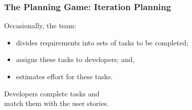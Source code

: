 \begin{frame}

\frametitle{The Planning Game: Iteration Planning}

\begin{changemargin}{1cm}

Occasionally, the team:

\begin{itemize}
\item divides requirements into sets of tasks to be completed;
\item assigns these tasks to developers; and,
\item estimates effort for these tasks.
\end{itemize}

Developers complete tasks and\\ match them with the user
stories.
\end{changemargin}

\end{frame}


